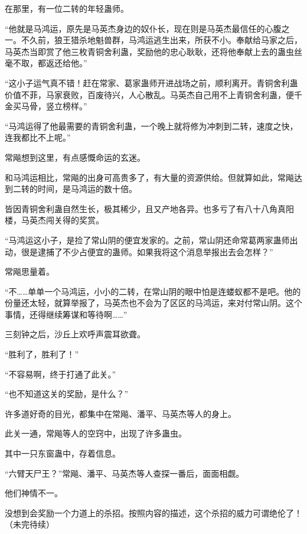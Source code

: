 \begin{this_body}
在那里，有一位二转的年轻蛊师。

“他就是马鸿运，原先是马英杰身边的奴仆长，现在则是马英杰最信任的心腹之一。不久前，狼王猎杀地魁兽群，马鸿运逃生出来，所获不小。奉献给马家之后，马英杰当即赏了他三枚青铜舍利蛊，奖励他的忠心耿耿，还将他奉献上去的蛊虫丝毫不取，都返还给他。”

“这小子运气真不错！赶在常家、葛家蛊师开进战场之前，顺利离开。青铜舍利蛊价值不菲，马家衰败，百废待兴，人心散乱。马英杰自己用不上青铜舍利蛊，便千金买马骨，竖立榜样。”

“马鸿运得了他最需要的青铜舍利蛊，一个晚上就将修为冲刺到二转，速度之快，连我都比不上呢。”

常飚想到这里，有点感慨命运的玄迷。

和马鸿运相比，常飚的出身可高贵多了，有大量的资源供给。但就算如此，常飚达到二转的时间，是马鸿运的数十倍。

皆因青铜舍利蛊自然生长，极其稀少，且又产地各异。也多亏了有八十八角真阳楼，马英杰闯关得的奖赏。

“马鸿运这小子，是捡了常山阴的便宜发家的。之前，常山阴还命常葛两家蛊师出动，很是逮捕了不少占便宜的蛊师。如果我将这个消息举报出去会怎样？”

常飚思量着。

“不……单单一个马鸿运，小小的二转，在常山阴的眼中怕是连蝼蚁都不是吧。他的份量还太轻，就算举报了，马英杰也不会为了区区的马鸿运，来对付常山阴。这个事情，还得继续筹谋和等待啊……”

三刻钟之后，沙丘上欢呼声震耳欲聋。

“胜利了，胜利了！”

“不容易啊，终于打通了此关。”

“也不知道这关的奖励，是什么？”

许多道好奇的目光，都集中在常飚、潘平、马英杰等人的身上。

此关一通，常飚等人的空窍中，出现了许多蛊虫。

其中一只东窗蛊中，存着信息。

“六臂天尸王？”常飚、潘平、马英杰等人查探一番后，面面相觑。

他们神情不一。

没想到会奖励一个力道上的杀招。按照内容的描述，这个杀招的威力可谓绝伦了！（未完待续）

\end{this_body}

